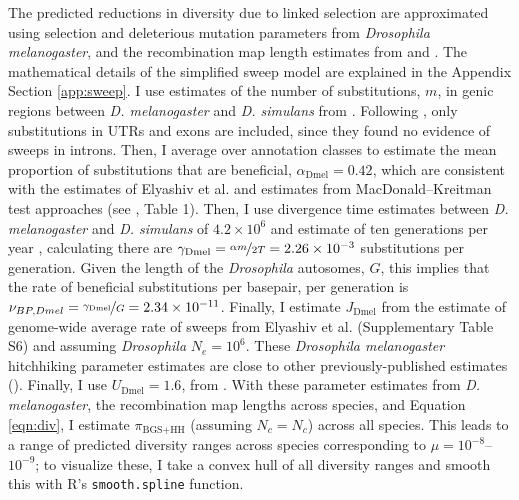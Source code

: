 \documentclass[9pt,lineno]{elife}
\begin{document}
The predicted reductions in diversity due to linked selection are approximated
using selection and deleterious mutation parameters from \emph{Drosophila
melanogaster}, and the recombination map length estimates from
\cite{Stapley2017-fs} and \cite{Corbett-Detig2015-gt}. The mathematical details
of the simplified sweep model are explained in the Appendix Section
\ref{app:sweep}. I use estimates of the number of substitutions, $m$, in genic
regions between \emph{D.  melanogaster} and \emph{D. simulans} from
\cite{Hu2013-pg}.  Following \cite{Elyashiv2016-vt}, only substitutions in UTRs
and exons are included, since they found no evidence of sweeps in introns.
Then, I average over annotation classes to estimate the mean proportion of
substitutions that are beneficial, $\alpha_\text{Dmel}=0.42$, which are
consistent with the estimates of Elyashiv et al. and estimates from
MacDonald--Kreitman test approaches (see \cite{Eyre-Walker2006-li}, Table 1).
Then, I use divergence time estimates between \emph{D. melanogaster} and
\emph{D. simulans} of $4.2 \times 10^6$ and estimate of ten generations per
year \citep{Obbard2012-on}, calculating there are $\gamma_\text{Dmel} =
\nicefrac{\alpha m}{2T} = 2.26 \times 10^{-3}$ substitutions per generation.
Given the length of the \emph{Drosophila} autosomes, $G$, this implies that the
rate of beneficial substitutions per basepair, per generation is $\nu_{BP,Dmel}
= \nicefrac{\gamma_\text{Dmel}}{G} = 2.34 \times 10^{-11}$. Finally, I estimate
$J_\text{Dmel}$ from the estimate of genome-wide average rate of sweeps from
Elyashiv et al. (Supplementary Table S6) and assuming \emph{Drosophila} $N_e =
10^6$. These \emph{Drosophila melanogaster} hitchhiking parameter estimates are
close to other previously-published estimates
(). Finally, I use $U_\text{Dmel} = 1.6$,
from \cite{Elyashiv2016-vt}. With these parameter estimates from \emph{D.
melanogaster}, the recombination map lengths across species, and Equation
\eqref{eqn:div}, I estimate $\pi_\text{BGS+HH}$ (assuming $N_c=N_c$) across all
species. This leads to a range of predicted diversity ranges across species
corresponding to $\mu=10^{-8}$--$10^{-9}$; to visualize these, I take a convex
hull of all diversity ranges and smooth this with R's \texttt{smooth.spline}
function.


\end{document}
